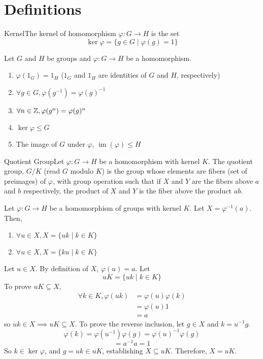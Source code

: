 \documentclass{report}
\newcommand{\mprop}[2]{\begin{Prop}{#1}{}#2\end{Prop}}
\newcommand{\dfn}[2]{\begin{Definition}[colbacktitle=red!75!black]{#1}{}#2\end{Definition}}
\newenvironment{myproof}[1][\proofname]{%
	\proof[\bfseries #1: ]%
}{\endproof}
\DeclareMathOperator{\img}{im} %
\begin{document}
\section{Definitions}
\dfn{Kernel}{The kernel of homomorphism $\varphi : G \to H$ is the set 
$$\ker \varphi = \{ g \in G \mid \varphi(g) = 1 \}$$}
\mprop{}{Let $G$ and $H$ be groups and $\varphi : G \to H$ be a homomorphism.
\begin{enumerate}
    \item $\varphi (1_G) = 1_H$ ($1_G$ and $1_H$ are identities of $G$ and $H$, respectively)
    \item $\forall g \in G, \varphi(g^{-1}) = \varphi(g)^{-1}$
    \item $\forall n \in \mathbb{Z}, \varphi(g^n) = \varphi(g)^n$
    \item $\ker \varphi \leq G$
    \item The image of $G$ under $\varphi$, $\img (\varphi) \leq H$
\end{enumerate}}
\dfn{Quotient Group}{Let $\varphi : G \to H$ be a homomorphism with kernel $K$. The quotient group, $G/K$ (read $G$ modulo $K$) is the group whose elements are fibers (set of preimages) of $\varphi$, with group operation such that if $X$ and $Y$ are the fibers above $a$ and $b$ respectively, the product of $X$ and $Y$ is the fiber above the product $ab$. }
\mprop{}{Let $\varphi : G \to H$ be a homomorphism of groups with kernel $K$. Let $X = \varphi^{-1} (a)$. Then, 
\begin{enumerate}
    \item $\forall u \in X, X = \{uk \mid k \in K \}$
    \item $\forall u \in X, X = \{ku \mid k \in K \}$
\end{enumerate}}
\begin{myproof}
    Let $u \in X$. By definition of $X$, $\varphi (u) = a$. Let 
    $$uK = \{ uk \mid k \in K \}$$
    To prove $uK \subseteq X$, 
    \begin{align*}
        \forall k \in K, \varphi(uk) &= \varphi(u)\varphi(k)\\
        &= \varphi(u)1\\
        &= a
    \end{align*}
    so $uk \in X \implies uK \subseteq X$. To prove the reverse inclusion, let $g \in X$ and $k = u^{-1} g$. 
    $$\varphi(k) = \varphi(u^{-1} )\varphi(g) = \varphi(u)^{-1} \varphi (g)$$
    $$= a^{-1} a = 1$$
    So $k \in \ker \varphi$, and $g = uk \in uK$, establishing $X \subseteq uK$. Therefore, $X = uK$. 
\end{myproof}
\end{document}
